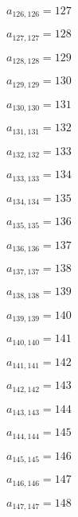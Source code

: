 \documentclass[a4paper,12pt]{article}
\begin{document}
$a _{ 126, 126 } = 127$

$a _{ 127, 127 } = 128$

$a _{ 128, 128 } = 129$

$a _{ 129, 129 } = 130$

$a _{ 130, 130 } = 131$

$a _{ 131, 131 } = 132$

$a _{ 132, 132 } = 133$

$a _{ 133, 133 } = 134$

$a _{ 134, 134 } = 135$

$a _{ 135, 135 } = 136$

$a _{ 136, 136 } = 137$

$a _{ 137, 137 } = 138$

$a _{ 138, 138 } = 139$

$a _{ 139, 139 } = 140$

$a _{ 140, 140 } = 141$

$a _{ 141, 141 } = 142$

$a _{ 142, 142 } = 143$

$a _{ 143, 143 } = 144$

$a _{ 144, 144 } = 145$

$a _{ 145, 145 } = 146$

$a _{ 146, 146 } = 147$

$a _{ 147, 147 } = 148$
\end{document}
